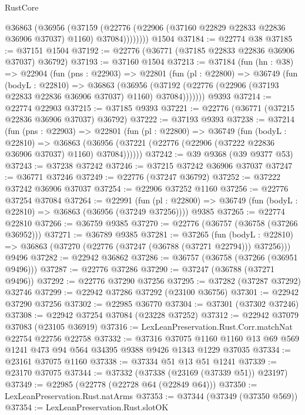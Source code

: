 \begin{lexlean}{RustCore}
\begin{coremodule}
            @36863
              (@36956
                (@37159
                  (@22776 (@22906 (@37160 @22829 @22833 @22836 @36906 @37037) @1160) @37084))))))))
    @1504
@37184 := @22774 @38
@37185 := @37151 @1504
@37192 := @22776 (@36771 (@37185 @22833 @22836 @36906 @37037) @36792)
@37193 := @37160 @1504
@37213 := @37184
    (fun (hn : @38) =>
    @22904
      (fun (pns : @22903) =>
      @22801
        (fun (pl : @22800) =>
        @36749
          (fun (bodyL : @22810) =>
          @36863
            (@36956
              (@37192 (@22776 (@22906 (@37193 @22833 @22836 @36906 @37037) @1160) @37084)))))))
    @9393
@37214 := @22774 @22903
@37215 := @37185 @9393
@37221 := @22776 (@36771 (@37215 @22836 @36906 @37037) @36792)
@37222 := @37193 @9393
@37238 := @37214
    (fun (pns : @22903) =>
    @22801
      (fun (pl : @22800) =>
      @36749
        (fun (bodyL : @22810) =>
        @36863 (@36956 (@37221 (@22776 (@22906 (@37222 @22836 @36906 @37037) @1160) @37084))))))
@37242 := @39 @9368 (@39 @9377 @53)
@37243 := @37238 @37242
@37246 := @37215 @37242 @36906 @37037
@37247 := @36771 @37246
@37249 := @22776 (@37247 @36792)
@37252 := @37222 @37242 @36906 @37037
@37254 := @22906 @37252 @1160
@37256 := @22776 @37254 @37084
@37264 := @22991
    (fun (pl : @22800) => @36749 (fun (bodyL : @22810) => @36863 (@36956 (@37249 @37256))))
    @9385
@37265 := @22774 @22810
@37266 := @36759 @9385
@37270 := @22776 (@36757 (@36758 (@37266 @36952)))
@37271 := @36789 @9385
@37281 := @37265
    (fun (bodyL : @22810) => @36863 (@37270 (@22776 (@37247 (@36788 (@37271 @22794))) @37256)))
    @9496
@37282 := @22942 @36862
@37286 := @36757 (@36758 (@37266 (@36951 @9496)))
@37287 := @22776 @37286
@37290 := @37247 (@36788 (@37271 @9496))
@37292 := @22776 @37290 @37256
@37295 := @37282 (@37287 @37292) @32746
@37299 := @22942 @37286 @37292 (@23100 @36756)
@37301 := @22942 @37290 @37256
@37302 := @22985 @36770
@37304 := @37301 (@37302 @37246)
@37308 := @22942 @37254 @37084 (@23228 @37252)
@37312 := @22942 @37079 @37083 (@23105 @36919)
@37316 := LexLeanPreservation.Rust.Corr.matchNat @22754 @22756 @22758
@37332 := @37316
    @37075
    @1160
    @1160
    @13
    @69
    @569
    @1241
    @473
    @94
    @564
    @34395
    @9388
    @9426
    @1343
    @1229
    @37035
@37334 := @23161 @37075 @1160
@37338 := @37334 @51 @13 @51 @1241
@37339 := @23170 @37075
@37344 := @37332 (@37338 (@23169 (@37339 @51)) @23197)
@37349 := @22985 (@22778 (@22728 @64 (@22849 @64)))
@37350 := LexLeanPreservation.Rust.natArms
@37353 := @37344 (@37349 (@37350 @569))
@37354 := LexLeanPreservation.Rust.slotOK

\end{coremodule}
\end{lexlean}
